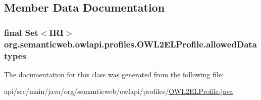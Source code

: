 \subsection{Member Data Documentation}
\hypertarget{classorg_1_1semanticweb_1_1owlapi_1_1profiles_1_1_o_w_l2_e_l_profile_a34e0b830f2ae570728bcaf91f440bbfc}{
\subsubsection[{allowed\-Datatypes}]{\setlength{\rightskip}{0pt plus 5cm}final Set$<${\bf I\-R\-I}$>$ org.\-semanticweb.\-owlapi.\-profiles.\-O\-W\-L2\-E\-L\-Profile.\-allowed\-Datatypes\hspace{0.3cm}{\ttfamily [protected]}}}\label{classorg_1_1semanticweb_1_1owlapi_1_1profiles_1_1_o_w_l2_e_l_profile_a34e0b830f2ae570728bcaf91f440bbfc}


The documentation for this class was generated from the following file\-:\begin{DoxyCompactItemize}
\item 
api/src/main/java/org/semanticweb/owlapi/profiles/\hyperlink{_o_w_l2_e_l_profile_8java}{O\-W\-L2\-E\-L\-Profile.\-java}\end{DoxyCompactItemize}
